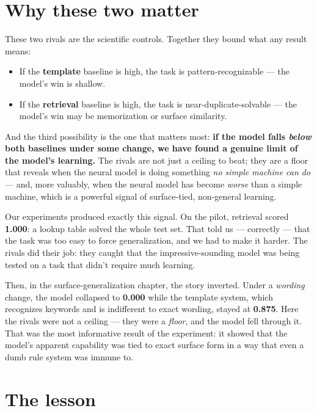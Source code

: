 \section{Why these two matter}\label{why-these-two-matter}

These two rivals are the scientific controls. Together they bound what
any result means:

\begin{itemize}
\tightlist
\item
  If the \textbf{template} baseline is high, the task is
  pattern-recognizable --- the model's win is shallow.
\item
  If the \textbf{retrieval} baseline is high, the task is
  near-duplicate-solvable --- the model's win may be memorization or
  surface similarity.
\end{itemize}

And the third possibility is the one that matters most: \textbf{if the
model falls \emph{below} both baselines under some change, we have found
a genuine limit of the model's learning.} The rivals are not just a
ceiling to beat; they are a floor that reveals when the neural model is
doing something \emph{no simple machine can do} --- and, more valuably,
when the neural model has become \emph{worse} than a simple machine,
which is a powerful signal of surface-tied, non-general learning.

Our experiments produced exactly this signal. On the pilot, retrieval
scored \textbf{1.000}: a lookup table solved the whole test set. That
told us --- correctly --- that the task was too easy to force
generalization, and we had to make it harder. The rivals did their job:
they caught that the impressive-sounding model was being tested on a
task that didn't require much learning.

Then, in the surface-generalization chapter, the story inverted. Under a
\emph{wording} change, the model collapsed to \textbf{0.000} while the
template system, which recognizes keywords and is indifferent to exact
wording, stayed at \textbf{0.875}. Here the rivals were not a ceiling
--- they were a \emph{floor}, and the model fell through it. That was
the most informative result of the experiment: it showed that the
model's apparent capability was tied to exact surface form in a way that
even a dumb rule system was immune to.

\section{The lesson}\label{the-lesson}

